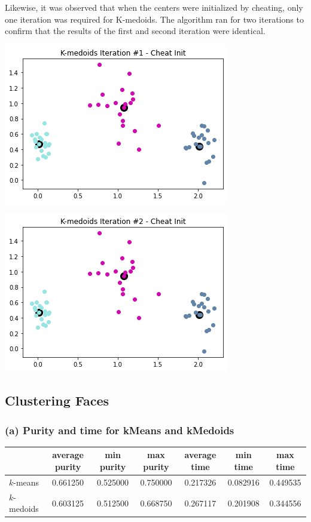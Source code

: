 \documentclass[11pt]{article}
\newcommand{\sol}[1]{{\bf{\color{magenta}{{Solution:}}}}}
\begin{document}
Likewise, it was observed that when the centers were initialized by cheating, only one iteration was required for K-medoids. The algorithm ran for two iterations to confirm that the results of the first and second iteration were identical.

\begin{center}
    \includegraphics[scale=0.6]{2f-3.png}
\end{center}

\begin{center}
    \includegraphics[scale=0.6]{2f-4.png}
\end{center}


\subsection{Clustering Faces}
\subsubsection{(a) Purity and time for kMeans and kMedoids}
\sol{} 
\begin{table}[H]
\centering
\begin{tabular}{l | cccccc}
            & average purity & min purity & max purity & average time & min time & max time\\ \hline
$k$-means   & 0.661250 & 0.525000 & 0.750000 & 0.217326 & 0.082916 & 0.449535\\
$k$-medoids & 0.603125 & 0.512500 & 0.668750 & 0.267117 & 0.201908 & 0.344556\\
\end{tabular}
\end{table}
\end{document}
